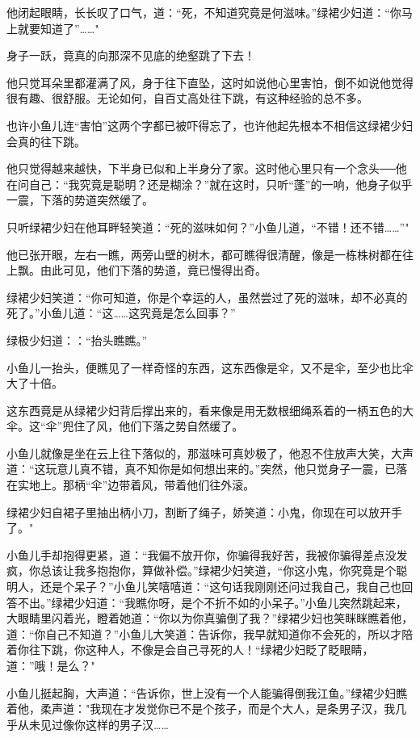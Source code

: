 \documentclass[12pt,oneside]{book}
\begin{document}
他闭起眼睛，长长叹了口气，道：``死，不知道究竟是何滋味。''绿裙少妇道：``你马上就要知道了''\ldots\ldots"

身子一跃，竟真的向那深不见底的绝壑跳了下去！

他只觉耳朵里都灌满了风，身于往下直坠，这时如说他心里害怕，倒不如说他觉得很有趣、很舒服。无论如何，自百丈高处往下跳，有这种经验的总不多。

也许小鱼儿连``害怕''这两个字都已被吓得忘了，也许他起先根本不相信这绿裙少妇会真的往下跳。

他只觉得越来越快，下半身已似和上半身分了家。这时他心里只有一个念头──他在问自己：``我究竟是聪明？还是糊涂？''就在这时，只听``蓬''的一响，他身子似乎一震，下落的势道突然缓了。

只听绿裙少妇在他耳畔轻笑道：``死的滋味如何？''小鱼儿道，``不错！还不错\ldots\ldots{}''"

他已张开眼，左右一瞧，两旁山壁的树木，都可瞧得很清醒，像是一栋株树都在往上飘。由此可见，他们下落的势道，竟已慢得出奇。

绿裙少妇笑道：``你可知道，你是个幸运的人，虽然尝过了死的滋味，却不必真的死了。''小鱼儿道：``这\ldots\ldots 这究竟是怎么回事？''

绿极少妇道：：``抬头瞧瞧。''

小鱼儿一抬头，便瞧见了一样奇怪的东西，这东西像是伞，又不是伞，至少也比伞大了十倍。

这东西竟是从绿裙少妇背后撑出来的，看来像是用无数根细绳系着的一柄五色的大伞。这``伞''兜住了风，他们下落之势自然缓了。

小鱼儿就像是坐在云上往下落似的，那滋味可真妙极了，他忍不住放声大笑，大声道：``这玩意儿真不错，真不知你是如何想出来的。''突然，他只觉身子一震，已落在实地上。那柄``伞''边带着风，带着他们往外滚。

绿裙少妇自裙子里抽出柄小刀，割断了绳子，娇笑道：小鬼，你现在可以放开手了。"

小鱼儿手却抱得更紧，道：``我偏不放开你，你骗得我好苦，我被你骗得差点没发疯，你总该让我多抱抱你，算做补偿。''绿裙少妇笑道，``你这小鬼，你究竟是个聪明人，还是个呆子？''小鱼儿笑嘻嘻道：``这句话我刚刚还问过我自己，我自己也回答不出。''绿裙少妇道：``我瞧你呀，是个不折不如的小呆子。''小鱼儿突然跳起来，大眼睛里闪着光，瞪着她道：``你以为你真骗倒了我？''绿裙少妇也笑眯眯瞧着他，道：``你自己不知道？''小鱼儿大笑道：告诉你，我早就知道你不会死的，所以才陪着你往下跳，你这种人，不像是会自己寻死的人！``绿裙少妇眨了眨眼睛，道：''哦！是么？"

小鱼儿挺起胸，大声道：``告诉你，世上没有一个人能骗得倒我江鱼。''绿裙少妇瞧着他，柔声道："我现在才发觉你已不是个孩子，而是个大人，是条男子汉，我几乎从未见过像你这样的男子汉\ldots\ldots{}
\end{document}
